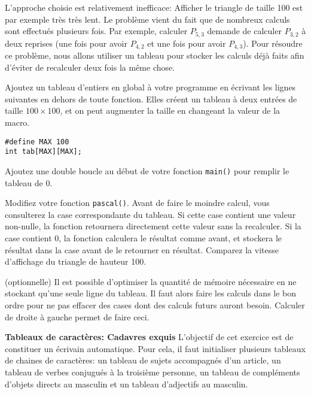 \documentclass[10pt]{article}\usepackage[enonce]{exemptty}
\begin{document}
L'approche choisie est relativement inefficace: Afficher le triangle de taille
100 est par exemple très très lent. Le problème vient du fait que de nombreux
calculs sont effectués plusieurs fois. Par exemple, calculer $P_{5,3}$ demande
de calculer $P_{3,2}$ à deux reprises (une fois pour avoir $P_{4,2}$ et une
fois pour avoir $P_{4,3}$). Pour résoudre ce problème, nous allons utiliser un
tableau pour stocker les calculs déjà faits afin d'éviter de recalculer deux
fois la même chose.

\Question Ajoutez un tableau d'entiers en global à votre programme en écrivant
les lignes suivantes en dehors de toute fonction. Elles créent un tableau à
deux entrées de taille $100\times100$, et on peut augmenter la taille en
changeant la valeur de la macro.

\begin{Verbatim}
#define MAX 100
int tab[MAX][MAX];
\end{Verbatim}

Ajoutez une double boucle au début de votre fonction \texttt{main()} pour
remplir le tableau de 0.

\Question Modifiez votre fonction \texttt{pascal()}. Avant de faire le moindre
calcul, vous consulterez la case correspondante du tableau. Si cette case
contient une valeur non-nulle, la fonction retournera directement cette valeur
sans la recalculer. Si la case contient 0, la fonction calculera le résultat
comme avant, et stockera le résultat dans la case avant de le retourner en
résultat. Comparez la vitesse d'affichage du triangle de hauteur 100.

\Question (optionnelle) Il est possible d'optimiser la quantité de mémoire
nécessaire en ne stockant qu'une seule ligne du tableau. Il faut alors faire
les calculs dans le bon ordre pour ne pas effacer des cases dont des calculs
futurs auront besoin. Calculer de droite à gauche permet de faire ceci.

\bigskip\Exercice\textbf{Tableaux de caractères: Cadavres exquis}
L'objectif de cet exercice est de constituer un écrivain automatique. Pour
cela, il faut initialiser plusieurs tableaux de chaines de caractères: un
tableau de sujets accompagnés d'un article, un tableau de verbes conjugués à la
troisième personne, un tableau de compléments d'objets directs au masculin et
un tableau d'adjectifs au masculin.
\end{document}
